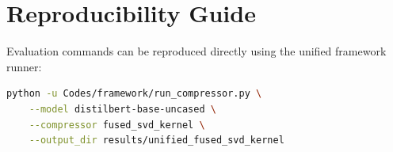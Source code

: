 \section{Reproducibility Guide}
Evaluation commands can be reproduced directly using the unified framework runner:
\begin{lstlisting}[language=bash]
python -u Codes/framework/run_compressor.py \
    --model distilbert-base-uncased \
    --compressor fused_svd_kernel \
    --output_dir results/unified_fused_svd_kernel
\end{lstlisting}
